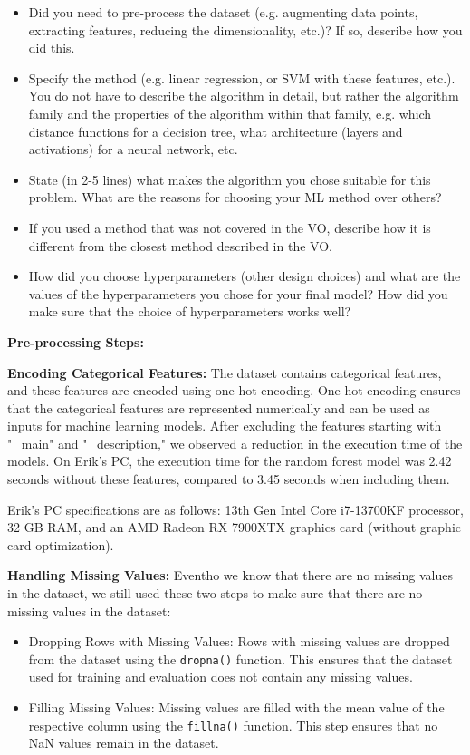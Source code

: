 \documentclass[a4, 10 pt, conference]{ieeeconf}  %
\begin{document}
{\color{blue}

  \begin{itemize}
    \item Did you need to pre-process the dataset (e.g. augmenting data points, extracting features, reducing the dimensionality, etc.)? If so, describe how you did this.
    \item Specify the method (e.g. linear regression, or SVM with these features, etc.). You do not have to describe the algorithm in detail, but rather the algorithm family and the properties of the algorithm within that family, e.g. which distance functions for a decision tree, what architecture (layers and activations) for a neural network, etc.
    \item State (in 2-5 lines) what makes the algorithm you chose suitable for this problem. What are the reasons for choosing your ML method over others?
    \item If you used a method that was not covered in the VO, describe how it is different from the closest method described in the VO.
    \item How did you choose hyperparameters (other design choices) and what are the values of the hyperparameters you chose for your final model? How did you make sure that the choice of hyperparameters works well?
  \end{itemize}
}

\textbf{Pre-processing Steps:}

\textbf{Encoding Categorical Features:} The dataset contains categorical features, and these features are encoded using one-hot encoding. One-hot encoding ensures that the categorical features are represented numerically and can be used as inputs for machine learning models.
After excluding the features starting with "\_main" and "\_description," we observed a reduction in the execution time of the models. On Erik's PC, the execution time for the random forest model was 2.42 seconds without these features, compared to 3.45 seconds when including them.

Erik's PC specifications are as follows: 13th Gen Intel Core i7-13700KF processor, 32 GB RAM, and an AMD Radeon RX 7900XTX graphics card (without graphic card optimization).

\textbf{Handling Missing Values:} Eventho we know that there are no missing values in the dataset, we still used these two steps to make sure that there are no missing values in the dataset:
\begin{itemize}
  \item Dropping Rows with Missing Values: Rows with missing values are dropped from the dataset using the \texttt{dropna()} function. This ensures that the dataset used for training and evaluation does not contain any missing values.
  \item Filling Missing Values: Missing values are filled with the mean value of the respective column using the \texttt{fillna()} function. This step ensures that no NaN values remain in the dataset.
\end{itemize}
\end{document}
